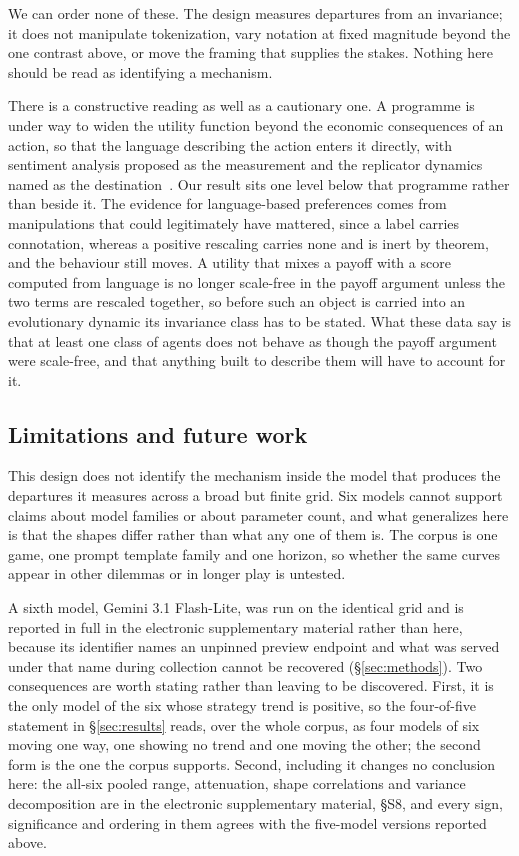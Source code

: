 \documentclass[11pt,a4paper]{article}
\begin{document}
We can order none of these. The design measures departures from an invariance;
it does not manipulate tokenization, vary notation at fixed magnitude beyond
the one contrast above, or move the framing that supplies the stakes. Nothing
here should be read as identifying a mechanism.

There is a constructive reading as well as a cautionary one. A programme is
under way to widen the utility function beyond the economic consequences of an
action, so that the language describing the action enters it directly, with
sentiment analysis proposed as the measurement and the replicator dynamics named
as the destination~\citep{capraro2024language}. Our result sits one level below
that programme rather than beside it. The evidence for language-based
preferences comes from manipulations that could legitimately have mattered,
since a label carries connotation, whereas a positive rescaling carries none and
is inert by theorem, and the behaviour still moves. A utility that mixes a
payoff with a score computed from language is no longer scale-free in the payoff
argument unless the two terms are rescaled together, so before such an object is
carried into an evolutionary dynamic its invariance class has to be stated. What
these data say is that at least one class of agents does not behave as though
the payoff argument were scale-free, and that anything built to describe them
will have to account for it.

\subsection{Limitations and future work}

This design does not identify the mechanism inside the model that produces the
departures it measures across a broad but finite grid. Six models cannot
support claims about model families or about parameter
count, and what generalizes here is that the shapes differ rather than what any
one of them is. The corpus is one game, one prompt template family and one
horizon, so whether the same curves appear in other dilemmas or in longer play
is untested.

A sixth model, Gemini 3.1 Flash-Lite, was run on the identical grid and is
reported in full in the electronic supplementary material rather than here,
because its identifier names an unpinned preview endpoint and what was served
under that name during collection cannot be recovered
(\S\ref{sec:methods}). Two consequences are worth stating rather than leaving to
be discovered. First, it is the only model of the six whose strategy trend is
positive, so the four-of-five statement in \S\ref{sec:results} reads, over the
whole corpus, as four models of six moving one way, one showing no trend and one
moving the other; the second form is the one the corpus supports. Second,
including it changes no conclusion here: the all-six pooled range, attenuation,
shape correlations and variance decomposition are in the electronic
supplementary material, \S S8, and every sign, significance and ordering in them
agrees with the five-model versions reported above.
\end{document}
